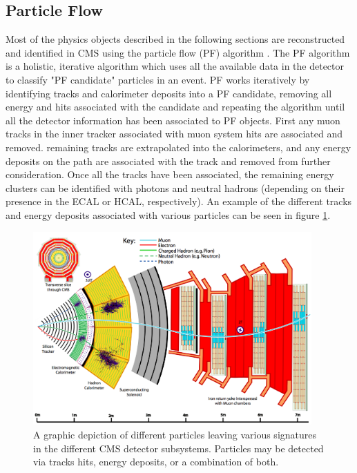 \subsection{Particle Flow}
\label{subsec:pf}
Most of the physics objects described in the following sections are reconstructed and identified in CMS using the particle flow (PF) algorithm \cite{Sirunyan:2017ulk}. The PF algorithm is a holistic, iterative algorithm which uses all the available data in the detector to classify "PF candidate" particles in an event. PF works iteratively by identifying tracks and calorimeter deposits into a PF candidate, removing all energy and hits associated with the candidate and repeating the algorithm until all the detector information has been associated to PF objects. First any muon tracks in the inner tracker associated with muon system hits are associated and removed. remaining tracks are extrapolated into the calorimeters, and any energy deposits on the path are associated with the track and removed from further consideration. Once all the tracks have been associated, the remaining energy clusters can be identified with photons and neutral hadrons (depending on their presence in the ECAL or HCAL, respectively). An example of the different tracks and energy deposits associated with various particles can be seen in figure \ref{fig:pfCandidates}.
\begin{figure}
	\centering
	\includegraphics[width=0.95\textwidth]{detector/figs/CMS_Slice_2}
	\caption{A graphic depiction of different particles leaving various signatures in the different CMS detector subsystems. Particles may be detected via tracks hits, energy deposits, or a combination of both.}
	\label{fig:pfCandidates}
\end{figure}

